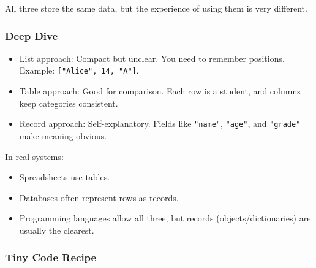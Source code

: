 \documentclass[
  letterpaper,
  DIV=11,
  numbers=noendperiod]{scrreprt}
\providecommand{\tightlist}{%
  \setlength{\itemsep}{0pt}\setlength{\parskip}{0pt}}
\begin{document}
All three store the same data, but the experience of using them is very
different.

\subsubsection{Deep Dive}\label{deep-dive-29}

\begin{itemize}
\tightlist
\item
  List approach: Compact but unclear. You need to remember positions.
  Example: \texttt{{[}"Alice",\ 14,\ "A"{]}}.
\item
  Table approach: Good for comparison. Each row is a student, and
  columns keep categories consistent.
\item
  Record approach: Self-explanatory. Fields like \texttt{"name"},
  \texttt{"age"}, and \texttt{"grade"} make meaning obvious.
\end{itemize}

In real systems:

\begin{itemize}
\tightlist
\item
  Spreadsheets use tables.
\item
  Databases often represent rows as records.
\item
  Programming languages allow all three, but records
  (objects/dictionaries) are usually the clearest.
\end{itemize}

\subsubsection{Tiny Code Recipe}\label{tiny-code-recipe-57}
\end{document}
